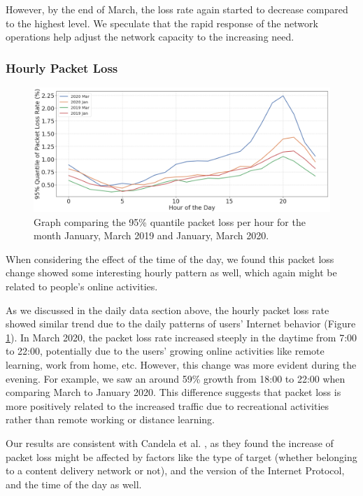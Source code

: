 However, by the end of March, the loss rate again started to decrease compared to the highest level. We speculate that the rapid response of the network operations help adjust the network capacity to the increasing need.

\subsubsection{Hourly Packet Loss}

\begin{figure}[ht]
\centering
\includegraphics[width=1.0\linewidth]{figs/packet_loss_per_hour.png}
\caption{Graph comparing the 95\% quantile packet loss per hour for the month January, March 2019 and January, March 2020.}
\label{fig:packetlossperhour}
\end{figure}


When considering the effect of the time of the day, we found this packet loss change showed some interesting hourly pattern as well, which again might be related to people's online activities.

As we discussed in the daily data section above, the hourly packet loss rate showed similar trend due to the daily patterns of users’ Internet behavior (Figure \ref{fig:packetlossperhour}). In March 2020, the packet loss rate increased steeply in the daytime from 7:00 to 22:00, potentially due to the users' growing online activities like remote learning, work from home, etc. However, this change was more evident during the evening. For example, we saw an around 59\% growth from 18:00 to 22:00 when comparing March to January 2020. This difference suggests that packet loss is more positively related to the increased traffic due to recreational activities rather than remote working or distance learning. 


Our results are consistent with Candela et al. \cite{Candela2020latency}, as they found the increase of packet loss might be affected by factors like the type of target (whether belonging to a content delivery network or not), and the version of the Internet Protocol, and the time of the day as well.





